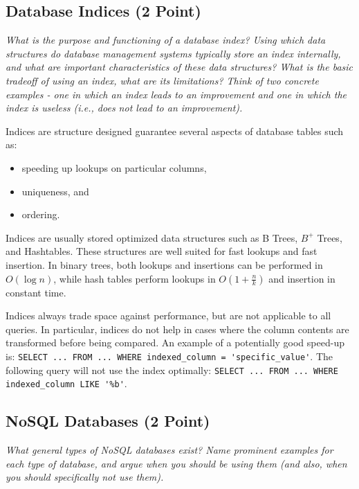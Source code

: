 \documentclass[a4paper,10pt]{article}
\begin{document}
\subsection{Database Indices (2 Point)}

\emph{What is the purpose and functioning of a database index? Using which data structures do database
management systems typically store an index internally, and what are important characteristics of these
data structures? What is the basic tradeoff of using an index, what are its limitations? Think of two
concrete examples - one in which an index leads to an improvement and one in which the index is useless
(i.e., does not lead to an improvement).}

\vspace{3mm}

Indices are structure designed guarantee several aspects of database tables such as:

\begin{itemize}
\item speeding up lookups on particular columns,
\item uniqueness, and
\item ordering.
\end{itemize}

Indices are usually stored optimized data structures such as B Trees, $B^+$ Trees, and Hashtables.
These structures are well suited for fast lookups and fast insertion. In binary trees, both lookups and insertions can be
performed in $O(\log n)$, while hash tables perform lookups in $O(1 + \frac{n}{k})$ and insertion in constant time.

Indices always trade space against performance, but are not applicable to all queries. In particular,
indices do not help in cases where the column contents are transformed before being compared. An example of
a potentially good speed-up is: \lstinline|SELECT ... FROM ... WHERE indexed_column = 'specific_value'|.
The following query will not use the index optimally: \lstinline|SELECT ... FROM ... WHERE indexed_column LIKE '%b'|.

\subsection{NoSQL Databases (2 Point)}

\emph{What general types of NoSQL databases exist? Name prominent examples for each type of database,
and argue when you should be using them (and also, when you should specifically not use them).}
\end{document}
